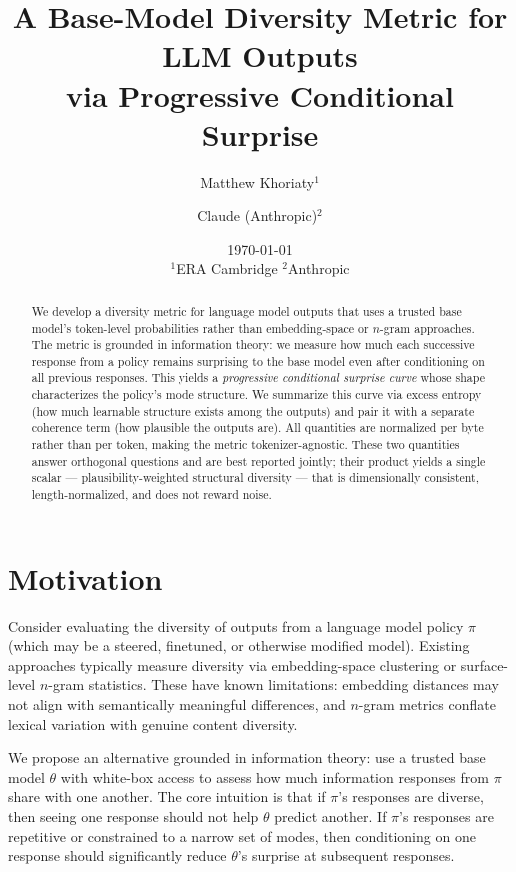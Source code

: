 \documentclass[11pt]{article}
\title{A Base-Model Diversity Metric for LLM Outputs\\via Progressive Conditional Surprise}
\author{Matthew Khoriaty$^1$ \and Claude (Anthropic)$^2$}
\date{\today\\[1em]\small $^1$ERA Cambridge \quad $^2$Anthropic}
\begin{document}
\maketitle

\begin{abstract}
We develop a diversity metric for language model outputs that uses a trusted base model's token-level probabilities rather than embedding-space or $n$-gram approaches. The metric is grounded in information theory: we measure how much each successive response from a policy remains surprising to the base model even after conditioning on all previous responses. This yields a \emph{progressive conditional surprise curve} whose shape characterizes the policy's mode structure. We summarize this curve via excess entropy (how much learnable structure exists among the outputs) and pair it with a separate coherence term (how plausible the outputs are). All quantities are normalized per byte rather than per token, making the metric tokenizer-agnostic. These two quantities answer orthogonal questions and are best reported jointly; their product yields a single scalar --- plausibility-weighted structural diversity --- that is dimensionally consistent, length-normalized, and does not reward noise.
\end{abstract}

\section{Motivation}

Consider evaluating the diversity of outputs from a language model policy $\pi$ (which may be a steered, finetuned, or otherwise modified model). Existing approaches typically measure diversity via embedding-space clustering \citep{lai2024llmmeans} or surface-level $n$-gram statistics. These have known limitations: embedding distances may not align with semantically meaningful differences, and $n$-gram metrics conflate lexical variation with genuine content diversity.

We propose an alternative grounded in information theory: use a trusted base model $\theta$ with white-box access to assess how much information responses from $\pi$ share with one another. The core intuition is that if $\pi$'s responses are diverse, then seeing one response should not help $\theta$ predict another. If $\pi$'s responses are repetitive or constrained to a narrow set of modes, then conditioning on one response should significantly reduce $\theta$'s surprise at subsequent responses.
\end{document}

